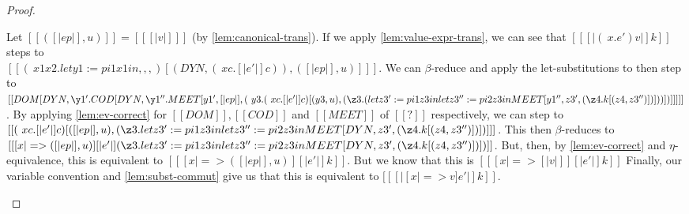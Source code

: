 \documentclass[11pt]{article}
\begin{document}
\begin{proof}
\begin{itemize}
		Let $[[( [|ep|], u)]] = [[ [|v|] ]]$ (by \autoref{lem:canonical-trans}).
        If we apply \autoref{lem:value-expr-trans}, we can see that $[[ [|(\ x  . e') v|]k ]]$
        steps to \\$[[ (\ x1  x2. let y1 := pi1 x1 in ,,,)[(DYN, (\ x c . [|e'|]c )), ( [|ep|], u) ]  ]]$.
        We can $\beta$-reduce and apply the let-substitutions to then step to
        \\$[[ DOM [DYN, \y1' . COD [ DYN, \y1''. MEET [y1', [|ep|], (\ y3 . (\ x c . [|e'|]c ) [(y3, u), (\z3 . \\( let z3' := pi1 z3 in let z3'' := pi2 z3 in MEET[y1'', z3', (\z4. k[(z4, z3'')] ) ] ) ) ] )] ] ] ]]$.
        By applying \autoref{lem:ev-correct} for $[[DOM]], [[COD]]$ and $[[MEET]]$ of $[[?]]$ respectively,
        we can step to  
        \\$[[  (\ x c . [|e'|]c ) [([|ep|], u), (\z3 . let z3' := pi1 z3 in let z3'' := pi2 z3 in MEET[DYN, z3', (\z4. k[(z4, z3'')] ) ] ) ] ]]$.
		This then $\beta$-reduces to 
		\\$[[  [ x |=> ([|ep|], u) ][|e'|](\z3 . let z3' := pi1 z3 in let z3'' := pi2 z3 in MEET[DYN, z3', (\z4. k[(z4, z3'')] ) ] ) ]]$.
		But, then, by \autoref{lem:ev-correct} and $\eta$-equivalence, this is equivalent to
		$[[  [ x |=> ([|ep|], u) ][|e'|]k  ]]$.
		But we know that this is $[[  [ x |=> [|v|] ][|e'|]k  ]]$ 
		Finally, our variable convention and \autoref{lem:subst-commut} give us that 
		this is equivalent to $[[ [| [x |=> v]e' |]k  ]]$.


\end{itemize}
\end{proof}
\end{document}
